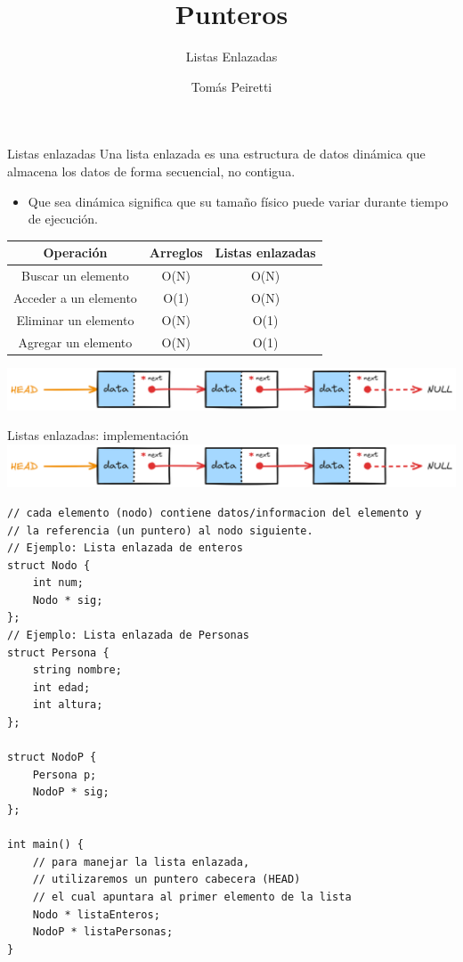 \documentclass[12pt]{beamer}
\title{Punteros}
\subtitle{Listas Enlazadas}
\author{Tomás Peiretti}
\date{}
\begin{document}
\maketitle

\begin{frame}{Listas enlazadas}
    Una lista enlazada es una \alert{estructura de datos dinámica} que almacena los datos de forma secuencial, no contigua.
    \begin{itemize}
        \item Que sea dinámica significa que su tamaño físico puede variar durante tiempo de ejecución.
    \end{itemize}
    \begin{table}[]
        \centering
        \begin{tabular}{|c|c|c|}
            \hline
            Operación & Arreglos & Listas enlazadas \\ \hline
            Buscar un elemento & O(N) & O(N) \\ \hline
            Acceder a un elemento & O(1) & O(N) \\ \hline
            Eliminar un elemento & O(N) & O(1) \\ \hline
            Agregar un elemento & O(N) & O(1) \\ \hline
        \end{tabular}
    \end{table}
    \includegraphics[width=\textwidth]{lista_enlazada.png}
\end{frame}

\begin{frame}[fragile]{Listas enlazadas: implementación}
   \includegraphics[width=\textwidth]{lista_enlazada.png}
\begin{lstlisting}[basicstyle=\tiny]
// cada elemento (nodo) contiene datos/informacion del elemento y
// la referencia (un puntero) al nodo siguiente.
// Ejemplo: Lista enlazada de enteros
struct Nodo {
    int num;
    Nodo * sig;
};
// Ejemplo: Lista enlazada de Personas
struct Persona {
    string nombre;
    int edad;
    int altura;
};

struct NodoP {
    Persona p;
    NodoP * sig;
};

int main() {
    // para manejar la lista enlazada,
    // utilizaremos un puntero cabecera (HEAD)
    // el cual apuntara al primer elemento de la lista
    Nodo * listaEnteros;
    NodoP * listaPersonas;
}
\end{lstlisting}
\end{frame}
\end{document}
